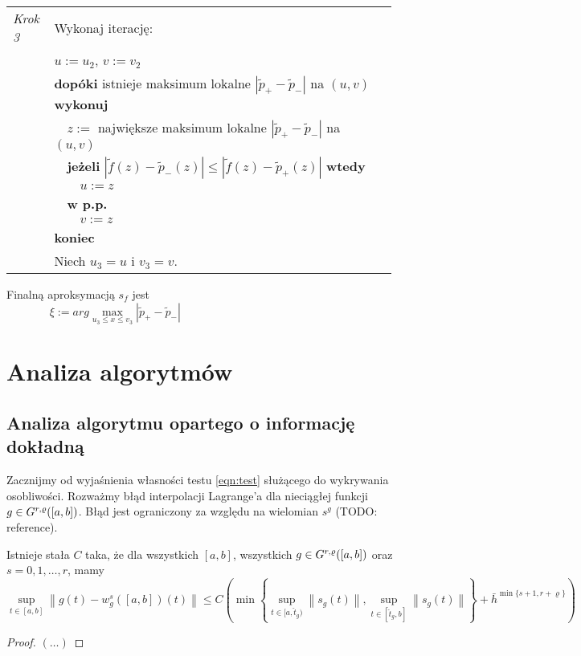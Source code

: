\documentclass[oik, pdftex, robocza, man]{mgrwms}
\begin{document}
\begin{tabular}{p{0.10\linewidth} p{0.85\linewidth}}
        \textit{Krok 3} & Wykonaj iterację: \\
                        & $u := u_2$, $v := v_2$ \\
                        & \textbf{dopóki} istnieje maksimum lokalne $|\tilde{p}_{+} - \tilde{p}_{-}|$ na $(u,v)$ \textbf{wykonuj} \\
                        & $\quad$$z :=$ największe maksimum lokalne $|\tilde{p}_{+} - \tilde{p}_{-}|$ na $(u,v)$ \\
                        & $\quad$\textbf{jeżeli} $|\tilde{f}(z) - \tilde{p}_{-}(z)| \leq |\tilde{f}(z) - \tilde{p}_{+}(z)|$ \textbf{wtedy} \\
                        & $\quad\quad$$u:= z$ \\
                        & $\quad$\textbf{w p.p.} \\
                        & $\quad\quad$$v:= z$ \\
                        & \textbf{koniec} \\
                        & Niech $u_3 = u$ i $v_3 = v$.
    \end{tabular} \vspace{10pt}

    Finalną aproksymacją $s_f$ jest
    \begin{equation*}
            \xi := arg \max_{u_3 \leq x \leq v_3}|\tilde{p}_{+} - \tilde{p}_{-}| \hspace{200pt}
    \end{equation*}

\mgrclosechapter


\chapter{Analiza algorytmów}

    \section{Analiza algorytmu opartego o informację dokładną}

    Zacznijmy od wyjaśnienia własności testu \ref{eqn:test} służącego do wykrywania osobliwości. Rozważmy błąd interpolacji Lagrange'a dla nieciągłej funkcji $g \in G^{r,\varrho}([a,b])$. Błąd jest ograniczony za względu na wielomian $s^{g}$ (TODO: reference).

    \begin{lemma}
        Istnieje stała $C$ taka, że dla wszystkich $[a,b]$, wszystkich $g \in G^{r,\varrho}([a,b])$ oraz $s=0,1,\dots,r$, mamy
        \begin{equation*}
            \sup _{t \in[a, b]}\left\|g(t)-w_{g}^{s}([a, b])(t)\right\| \leq C\left(\min \left\{\sup_{t \in[a, \hat{t}_{g})}\left\|s_{g}(t)\right\|, \sup _{t \in [\hat{t}_{g}, b]}\left\|s_{g}(t)\right\|\right\}+\bar{h}^{\min \{s+1, r+\varrho\}}\right)
        \end{equation*}
    \end{lemma}
    \begin{proof}
        $(\dots)$
    \end{proof}
\end{document}
